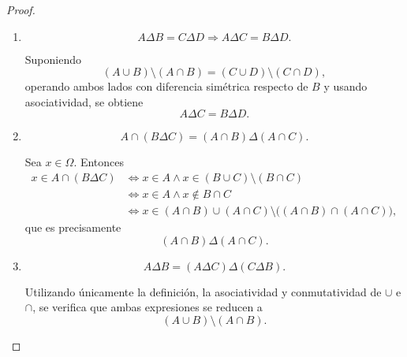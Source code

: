 \documentclass[12pt,a4paper]{article}
\begin{document}
\begin{proof}
\begin{enumerate}[label=(\alph*)]
            \item
            \[
                A\Delta B = C\Delta D
                \Rightarrow A\Delta C = B\Delta D.
            \]
    
            Suponiendo
            \[
                (A\cup B)\setminus(A\cap B)
                = (C\cup D)\setminus(C\cap D),
            \]
            operando ambos lados con diferencia simétrica
            respecto de $B$ y usando asociatividad,
            se obtiene
            \[
                A\Delta C = B\Delta D.
            \]
    
            \item
            \[
                A \cap (B \Delta C)
                = (A \cap B)\Delta(A \cap C).
            \]
    
            Sea $x\in\Omega$. Entonces
            \begin{align*}
                x\in A\cap(B\Delta C)
                &\iff x\in A \land x\in (B\cup C)\setminus(B\cap C) \\
                &\iff x\in A \land x\notin B\cap C \\
                &\iff x\in (A\cap B)\cup(A\cap C)
                \setminus\big((A\cap B)\cap(A\cap C)\big),
            \end{align*}
            que es precisamente
            \[
                (A\cap B)\Delta(A\cap C).
            \]
    
            \item
            \[
                A \Delta B
                = (A \Delta C)\Delta(C \Delta B).
            \]
    
            Utilizando únicamente la definición,
            la asociatividad y conmutatividad de $\cup$ e $\cap$,
            se verifica que ambas expresiones
            se reducen a
            \[
                (A\cup B)\setminus(A\cap B).
            \]

        \end{enumerate}
    \end{proof}
\end{document}
